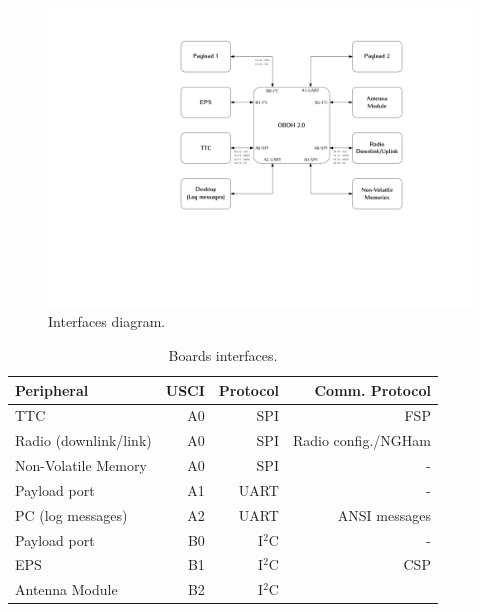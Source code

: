 \begin{figure}[!ht]
    \begin{center}
        \includegraphics[width=\textwidth]{figures/diagram_interfaces.pdf}
        \caption{Interfaces diagram.}
        \label{fig:diagram-interfaces}
    \end{center}
\end{figure}

\begin{table}[!h]
    \centering
    \begin{tabular}{lrrr}
        \toprule[1.5pt]
        \textbf{Peripheral}     & \textbf{USCI} & \textbf{Protocol} & \textbf{Comm. Protocol} \\
        \midrule
        TTC                     & A0            & SPI               & FSP \\
        Radio (downlink/link)   & A0            & SPI               & Radio config./NGHam \\
        Non-Volatile Memory     & A0            & SPI               & - \\
        Payload port            & A1            & UART              & -\footnotemark \\
        PC (log messages)       & A2            & UART              & ANSI messages \\
        Payload port            & B0            & I$^{2}$C          & -\footnotemark \\
        EPS                     & B1            & I$^{2}$C          & CSP \\
        Antenna Module          & B2            & I$^{2}$C          & \\
        \bottomrule[1.5pt]
    \end{tabular}
    \caption{Boards interfaces.}
    \label{tab:interfaces}
\end{table}

